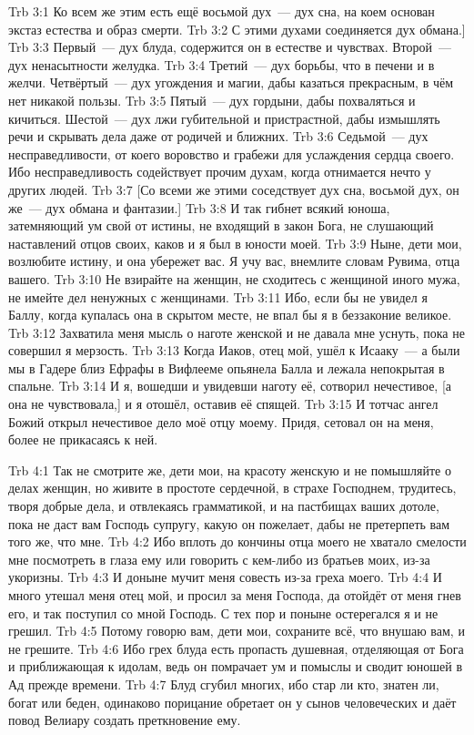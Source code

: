 \vs Trb 3:1
Ко всем же этим есть ещё восьмой дух~--- дух сна,
на коем основан экстаз естества и образ смерти.
\vs Trb 3:2
С этими духами соединяется дух обмана.]
\vs Trb 3:3
Первый~--- дух блуда, содержится он в естестве и чувствах.
Второй~--- дух ненасытности желудка.
\vs Trb 3:4
Третий~--- дух борьбы, что в печени и в желчи.
Четвёртый~--- дух угождения и магии, дабы казаться прекрасным,
в чём нет никакой пользы.
\vs Trb 3:5
Пятый~--- дух гордыни, дабы похваляться и кичиться.
Шестой~--- дух лжи губительной и пристрастной,
дабы измышлять речи и скрывать дела даже от родичей и ближних.
\vs Trb 3:6
Седьмой~--- дух несправедливости, от коего воровство и грабежи
для услаждения сердца своего.
Ибо несправедливость содействует прочим духам,
когда отнимается нечто у других людей.
\vs Trb 3:7
[Со всеми же этими соседствует дух сна, восьмой дух,
он же~--- дух обмана и фантазии.]
\vs Trb 3:8
И так гибнет всякий юноша, затемняющий ум свой от истины,
не входящий в закон Бога, не слушающий наставлений отцов своих,
каков и я был в юности моей.
\vs Trb 3:9
Ныне, дети мои, возлюбите истину, и она убережет вас.
Я учу вас, внемлите словам Рувима, отца вашего.
\vs Trb 3:10
Не взирайте на женщин, не сходитесь с женщиной иного мужа,
не имейте дел ненужных с женщинами.
\vs Trb 3:11
Ибо, если бы не увидел я Баллу, когда купалась она в скрытом месте,
не впал бы я в беззаконие великое.
\vs Trb 3:12
Захватила меня мысль о наготе женской и не давала мне уснуть,
пока не совершил я мерзость.
\vs Trb 3:13
Когда Иаков, отец мой, ушёл к Исааку~--- а были мы в Гадере
близ Ефрафы в Вифлееме опьянела Балла и лежала непокрытая
в спальне.
\vs Trb 3:14
И я, вошедши и увидевши наготу её, сотворил нечестивое,
[а она не чувствовала,] и я отошёл, оставив её спящей.
\vs Trb 3:15
И тотчас ангел Божий открыл нечестивое дело моё отцу моему.
Придя, сетовал он на меня, более не прикасаясь к ней.

\vs Trb 4:1
Так не смотрите же, дети мои, на красоту женскую
и не помышляйте о делах женщин,
но живите в простоте сердечной, в страхе Господнем,
трудитесь, творя добрые дела, и отвлекаясь грамматикой,
и на пастбищах ваших дотоле, пока не даст вам Господь супругу,
какую он пожелает, дабы не претерпеть вам того же, что мне.
\vs Trb 4:2
Ибо вплоть до кончины отца моего не хватало смелости мне посмотреть
в глаза ему или говорить с кем-либо из братьев моих, из-за укоризны.
\vs Trb 4:3
И доныне мучит меня совесть из-за греха моего.
\vs Trb 4:4
И много утешал меня отец мой, и просил за меня Господа,
да отойдёт от меня гнев его, и так поступил со мной Господь.
С тех пор и поныне остерегался я и не грешил.
\vs Trb 4:5
Потому говорю вам, дети мои, сохраните всё,
что внушаю вам, и не грешите.
\vs Trb 4:6
Ибо грех блуда есть пропасть душевная, отделяющая от Бога
и приближающая к идолам, ведь он помрачает ум и помыслы
и сводит юношей в Ад прежде времени.
\vs Trb 4:7
Блуд сгубил многих, ибо стар ли кто, знатен ли, богат или беден,
одинаково порицание обретает он у сынов человеческих и даёт повод
Велиару создать преткновение ему.

